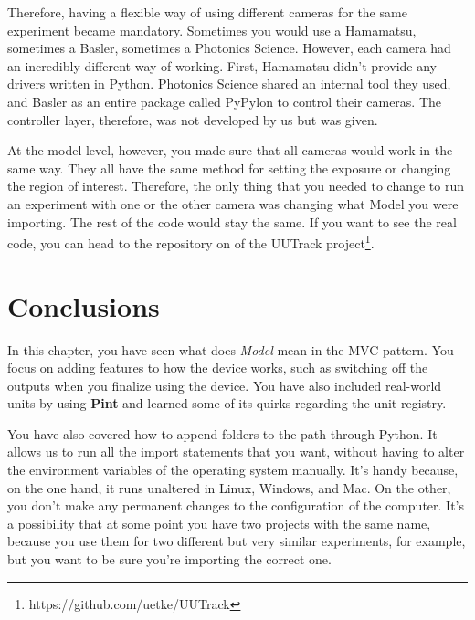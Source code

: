 Therefore, having a flexible way of using different cameras for the same experiment became mandatory. Sometimes you would use a Hamamatsu, sometimes a Basler, sometimes a Photonics Science. However, each camera had an incredibly different way of working. First, Hamamatsu didn't provide any drivers written in Python. Photonics Science shared an internal tool they used, and Basler as an entire package called PyPylon to control their cameras. The controller layer, therefore, was not developed by us but was given.

At the model level, however, you made sure that all cameras would work in the same way. They all have the same method for setting the exposure or changing the region of interest. Therefore, the only thing that you needed to change to run an experiment with one or the other camera was changing what Model you were importing. The rest of the code would stay the same. If you want to see the real code, you can head to the repository on of the UUTrack project\footnote{https://github.com/uetke/UUTrack}.

\section{Conclusions}\label{sec:device-model-conclusions2}
In this chapter, you have seen what does \emph{Model} mean in the {MVC} pattern. You focus on adding features to how the device works, such as switching off the outputs when you finalize using the device. You have also included real-world units by using \textbf{Pint} and learned some of its quirks regarding the unit registry.

You have also covered how to append folders to the path through Python. It allows us to run all the import statements that you want, without having to alter the environment variables of the operating system manually. It's handy because, on the one hand, it runs unaltered in Linux, Windows, and Mac. On the other, you don't make any permanent changes to the configuration of the computer. It's a possibility that at some point you have two projects with the same name, because you use them for two different but very similar experiments, for example, but you want to be sure you're importing the correct one.
